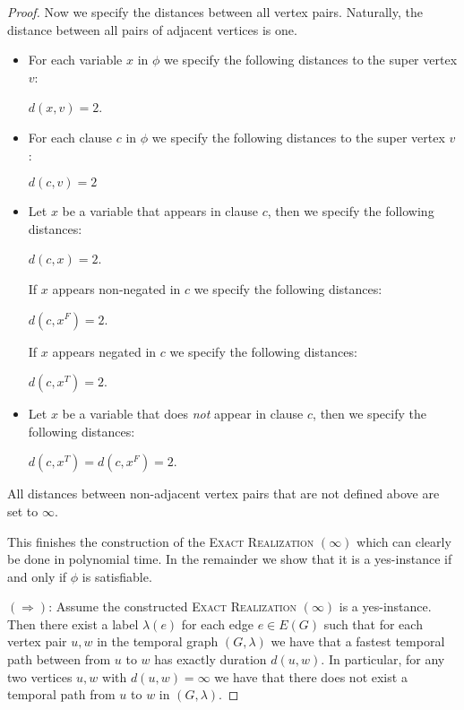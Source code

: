 \documentclass[11pt,a4paper]{article}
\theoremstyle{remark}
\theoremstyle{definition}
\begin{document}
\begin{proof}
Now we specify the distances between all vertex pairs. Naturally, the distance between all pairs of adjacent vertices is one.
\begin{itemize}
    

    \item For each variable $x$ in $\phi$ we specify the following distances to the super vertex $v$:

    $d(x,v)=2$. %

    \item For each clause $c$ in $\phi$ we specify the following distances to the super vertex $v$:

    $d(c,v)=2$
    \item Let $x$ be a variable that appears in clause $c$, then  we specify the following distances:

    $d(c,x)=2$.
    
    If $x$ appears non-negated in $c$ we specify the following distances:

    $d(c,x^F)=2$.

    If $x$ appears negated in $c$ we specify the following distances:

    $d(c,x^T)=2$.
    \item Let $x$ be a variable that does \emph{not} appear in clause $c$, then we specify the following distances:

    $d(c,x^T)=d(c,x^F)=2$.
\end{itemize}
All distances between non-adjacent vertex pairs that are not defined above are set to $\infty$.

This finishes the construction of the \textsc{Exact Realization $(\infty)$} which can clearly be done in polynomial time. In the remainder we show that it is a yes-instance if and only if $\phi$ is satisfiable.

$(\Rightarrow)$: Assume the constructed \textsc{Exact Realization $(\infty)$} is a yes-instance. Then there exist a label $\lambda(e)$ for each edge $e\in E(G)$ such that for each vertex pair $u,w$ in the temporal graph $(G,\lambda)$ we have that a fastest temporal path between from $u$ to $w$ has exactly duration $d(u,w)$. In particular, for any two vertices $u,w$ with $d(u,w)=\infty$ we have that there does not exist a temporal path from $u$ to $w$ in $(G,\lambda)$.


\end{proof}
\end{document}
